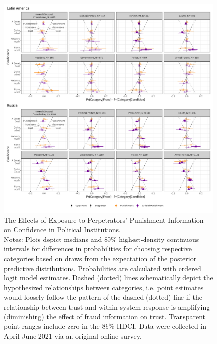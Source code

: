 \documentclass[11pt, ngerman,english,a4]{article}
\begin{document}
\begin{figure}
	\centering
	\includegraphics[width=\linewidth,trim=4 4 4 4,clip]{figs/cond_hdi89_1.png}
	\caption{The Effects of Exposure to Perpetrators' Punishment Information on Confidence in Political Institutions.  \\
		\footnotesize{Notes: Plots depict medians and 89\% highest-density continuous intervals for differences in probabilities for choosing respective categories based on draws from the expectation of the posterior predictive distributions. Probabilities are calculated with ordered logit model estimates.
			Dashed (dotted) lines schematically depict the hypothesized relationships between categories, i.e. point estimates would loosely follow the pattern of the dashed (dotted) line if the relationship between trust and within-system response is amplifying (diminishing) the effect of fraud information on trust. Transparent point ranges include zero in the 89\% HDCI.
	Data were collected in April-June 2021 via an original online survey. } }
	\label{fig:het}
\end{figure}
\end{document}
